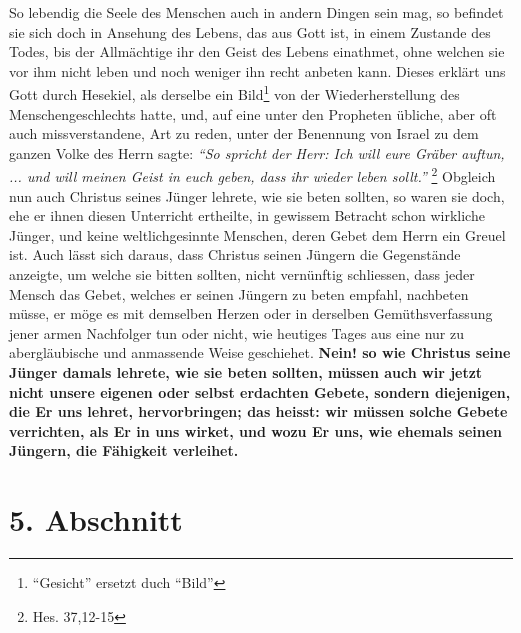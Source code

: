  So lebendig die Seele des Menschen auch in andern
Dingen sein mag, so befindet
sie sich doch in Ansehung des Lebens, das aus Gott ist, in einem Zustande des
Todes, bis der Allmächtige ihr den Geist des Lebens einathmet, ohne welchen sie
vor ihm nicht leben und noch weniger ihn recht anbeten kann. Dieses erklärt uns
Gott durch Hesekiel, als derselbe ein Bild\footnote{"`Gesicht"' ersetzt duch
"`Bild"'} von der Wiederherstellung des
Menschengeschlechts hatte, und,
auf eine unter den Propheten  übliche, aber oft auch
missverstandene, Art zu
reden, unter der Benennung von Israel  zu dem
ganzen Volke des Herrn sagte:
\textit{"`So spricht der Herr: Ich will eure Gräber auftun, ... und will meinen
Geist in
euch geben, dass ihr wieder leben sollt."'}
\footnote{Hes. 37,12-15}
Obgleich nun auch Christus seines
Jünger lehrete, wie sie beten sollten, so waren sie doch, ehe er ihnen diesen
Unterricht ertheilte, in gewissem Betracht schon wirkliche Jünger, und keine
weltlichgesinnte Menschen, deren Gebet dem Herrn ein Greuel ist. Auch
lässt sich daraus, dass Christus seinen Jüngern die Gegenstände anzeigte, um
welche sie bitten sollten, nicht
vernünftig schliessen, dass jeder Mensch das Gebet, welches er seinen Jüngern zu
beten empfahl, nachbeten  müsse, er möge es mit
demselben Herzen oder in
derselben Gemüthsverfassung jener armen Nachfolger tun oder nicht, wie heutiges
Tages aus eine nur zu abergläubische und anmassende Weise geschiehet.
\textbf{Nein! so
wie Christus seine Jünger damals lehrete, wie sie beten sollten, müssen auch wir
jetzt nicht unsere eigenen oder selbst erdachten Gebete, sondern diejenigen, die
Er uns
lehret, hervorbringen; das heisst: wir müssen solche Gebete verrichten, als Er
in uns wirket, und wozu Er uns, wie ehemals seinen Jüngern, die Fähigkeit
verleihet.}

\section{5. Abschnitt} \label{kap6_ab5}

